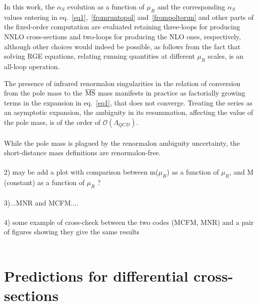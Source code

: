 \documentclass[12pt,a4paper]{article}
\begin{document}
In this work, the $\alpha_S$ evolution as a function of $\mu_R$ and the corresponding $\alpha_S$ values entering in eq.~\ref{eq1},~\ref{fromruntopol} and~\ref{frompoltorun} and other parts of the fixed-order computation are evaluated retaining three-loops for producing NNLO cross-sections and two-loops for producing the NLO ones, respectively, although other choices would indeed be possible, as follows from the fact that solving RGE equations, relating running quantities at different $\mu_R$ scales, is an all-loop operation.

The presence of infrared renormalon singularities in the relation of conversion from the pole mass to the $\overline{\rm MS}$ mass manifests in practice as factorially growing terms in the expansion in eq.~\ref{eq1}, that does not converge. 
Treating the series as an asymptotic expansion, the ambiguity in its resummation, affecting the value of the pole mass, is of the order of $\mathcal{O}(\Lambda_{QCD})$.   
\\
\\
While the pole mass is plagued by the renormalon ambiguity uncertainty, the short-distance mass definitions are renormalon-free.  
\\
\\

2) may be add a plot with comparison between m($\mu_R$) as a function of $\mu_R$, and M (constant) as a function of $\mu_R$ ? 
\\
\\
3)...MNR and MCFM....
\\
\\
4) some example of cross-check between the two codes (MCFM, MNR) and a pair of figures
showing they give the same results
\\
\\

\section{Predictions for differential cross-sections}
\label{diffe}
\end{document}
